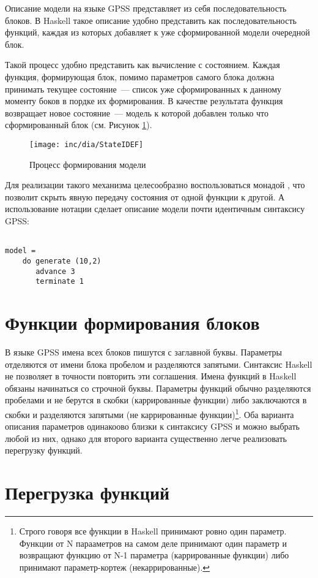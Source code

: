 Описание модели на языке GPSS представляет из себя последовательность блоков. В Haskell такое описание удобно представить как последовательность функций, каждая из которых добавляет к уже сформированной модели очередной блок. 

Такой процесс удобно представить как вычисление с состоянием. Каждая функция, формирующая блок, помимо параметров самого блока должна принимать текущее состояние~--- список уже сформированных к данному моменту боков в пордке их формирования. В качестве результата функция возвращает новое состояние~--- модель к которой добавлен только что сформированный блок (см. Рисунок \ref{fig:StateIDEF}).

\begin{figure}[ht]
  \centering
  \texttt{[image: inc/dia/StateIDEF]}
  \caption{Процесс формирования модели}
  \label{fig:StateIDEF}
\end{figure}

Для реализации такого механизма целесообразно воспользоваться монадой , что позволит скрыть явную передачу состояния от одной функции к другой. А использование нотации  сделает описание модели почти идентичным синтаксису GPSS:

\begin{verbatim}

model = 
    do generate (10,2)
       advance 3
       terminate 1

\end{verbatim}


\section{Функции формирования блоков}

В языке GPSS имена всех блоков пишутся с заглавной буквы. Параметры отделяются от имени блока пробелом и разделяются запятыми. Синтаксис Haskell не позволяет в точности повторить эти соглашения. Имена функций в Haskell обязаны начинаться со строчной буквы. Параметры функций обычно разделяются пробелами и не берутся в скобки (каррированные функции) либо заключаются в скобки и разделяются запятыми (не каррированные функции)\footnote{Строго говоря все функции в Haskell принимают ровно один параметр. Функции от N парааметров на самом деле принимают один параметр и возвращают функцию от N-1 параметра (каррированные функции) либо принимают параметр-кортеж (некаррированные).}. Оба варианта описания параметров одинакоово близки к синтаксису GPSS и можно выбрать любой из них, однако для второго варианта существенно легче реализовать перегрузку функций.

\section{Перегрузка функций}
